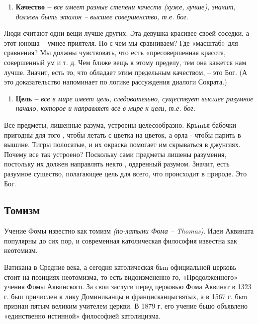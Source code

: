 \documentclass[a4paper, 14pt]{extreport}
\begin{document}
\begin{enumerate}
\def\labelenumi{\arabic{enumi}.}
\setcounter{enumi}{3}
\item
  
  \textbf{Качество --}
  \emph{все имеет разные степени качеств (хуже, лучше), значит, должен
  быть эталон -- высшее совершенство, т.е. бог.}
  
\end{enumerate}

Люди считают одни вещи лучше других. Эта девушка красивее своей соседки,
а этот юноша -- умнее приятеля. Но с чем мы сравниваем? Где «масштаб»
для сравнения? Мы должны чувствовать, что есть «пресовершенная красота,
совершенный ум и т. д. Чем ближе вещь к этому пределу, тем она кажется
нам лучше. Значит, есть то, что обладает этим предельным качеством, --
это Бог. (А это доказательство напоминает по логике рассуждения диалоги
Сократа.)

\begin{enumerate}
\def\labelenumi{\arabic{enumi}.}
\setcounter{enumi}{4}
\item
  
  \textbf{Цель --}
  \emph{все в мире имеет цель, следовательно, существует высшее разумное
  начало, которое и направляет все в мире к цели, т.е. бог.}
  
\end{enumerate}

Все предметы, лишенные разума, устроены целесообразно. Крьmья бабочки
пригодны для того , чтобы летать с цветка на цветок, а орла - чтобы
парить в вышине. Тигры полосатые, и их окраска помогает им скрываться в
джунглях. Почему все так устроено? Поскольку сами предметы лишены
разумения, постольку их должен направлять некто , одаренный разумом.
Значит, есть разумное существо, полагающее цель для всего, что
происходит в природе. Это Бог.

\subsection{Томизм}

Учение Фомы известно как томизм \emph{(по-латыни Фома -- Thomas)}. Идеи
Аквината популярны до сих пор, и современная католическая философия
известна как неотомизм.

Ватикана в Средние века, а сегодня католическая бьm официальной церковь
стоит на позициях неотомизма, то есть видоизмененно­ го, «Продолженного»
учения Фомы Аквинского. За свои заслуги перед церковью Фома Аквинат в
1323 г. бьш причислен к лику Доминиканцы и францисканцысвятых, а в 1567
г. бьm признан пятым великим учителем церк­ви. В 1879 г. его учение бьшо
объявлено «единственно истин­ной» философией католицизма.
\end{document}
